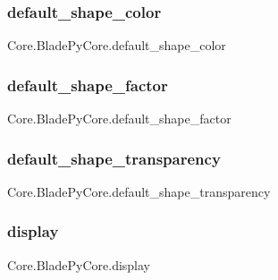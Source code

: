 \subsubsection{\texorpdfstring{default\+\_\+shape\+\_\+color}{default\_shape\_color}}
{\footnotesize\ttfamily Core.\+Blade\+Py\+Core.\+default\+\_\+shape\+\_\+color}

\hypertarget{class_core_1_1_blade_py_core_aafff31611ea2a5eb584f2550607e3e23}{}\label{class_core_1_1_blade_py_core_aafff31611ea2a5eb584f2550607e3e23} 
\subsubsection{\texorpdfstring{default\+\_\+shape\+\_\+factor}{default\_shape\_factor}}
{\footnotesize\ttfamily Core.\+Blade\+Py\+Core.\+default\+\_\+shape\+\_\+factor}

\hypertarget{class_core_1_1_blade_py_core_a26accbeb5266ec3f792c86cf8643f696}{}\label{class_core_1_1_blade_py_core_a26accbeb5266ec3f792c86cf8643f696} 
\subsubsection{\texorpdfstring{default\+\_\+shape\+\_\+transparency}{default\_shape\_transparency}}
{\footnotesize\ttfamily Core.\+Blade\+Py\+Core.\+default\+\_\+shape\+\_\+transparency}

\hypertarget{class_core_1_1_blade_py_core_abe828f3ea500c70a4abe0f376b6d8dc4}{}\label{class_core_1_1_blade_py_core_abe828f3ea500c70a4abe0f376b6d8dc4} 
\subsubsection{\texorpdfstring{display}{display}}
{\footnotesize\ttfamily Core.\+Blade\+Py\+Core.\+display}



